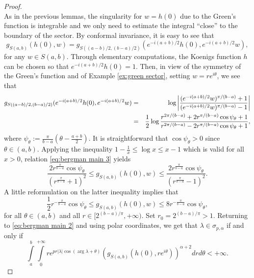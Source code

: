 \documentclass[11pt]{amsart}
\numberwithin{equation}{section}
\theoremstyle{definition}
\begin{document}
\begin{proof}
\begin{equation}
		\end{equation}
		As in the previous lemmas, the singularity for $w=h(0)$ due to the Green's function is integrable and we only need to estimate the integral ``close'' to the boundary of the sector. By conformal invariance, it is easy to see that 
		\begin{equation*}
			g_{S(a,b)}(h(0),w)=g_{S((a-b)/2,(b-a)/2)}(e^{-i(a+b)/2}h(0),e^{-i(a+b)/2}w), 
		\end{equation*}
		for any $w\in S(a,b)$. Through elementary computations, the Koenigs function $h$ can be chosen so that $e^{-i(a+b)/2}h(0)=1$. Then, in view of the symmetry of the Green's function and of Example \ref{ex:green sector}, setting $w=re^{i\theta}$, we see that
		\begin{eqnarray}\label{eq:bergman main 3}
			\notag	g_{S((a-b)/2,(b-a)/2)}(e^{-i(a+b)/2}h(0),e^{-i(a+b)/2}w)&=&\log\left|\dfrac{(e^{-i(a+b)/2}w)^{\pi/(b-a)}+1}{(e^{-i(a+b)/2}w)^{\pi/(b-a)}-1}\right| \\
			&=&\frac{1}{2}\log\dfrac{r^{2\pi/(b-a)}+2r^{\pi/(b-a)}\cos\psi_\theta+1}{r^{2\pi/(b-a)}-2r^{\pi/(b-a)}\cos\psi_\theta+1},
		\end{eqnarray}
		where $\psi_\theta:=\frac{\pi}{b-a}(\theta-\frac{a+b}{2})$. It is straightforward that $\cos\psi_\theta>0$ since $\theta\in(a,b)$. Applying the inequality $1-\frac{1}{x}\le \log x \le x-1$ which is valid for all $x>0$, relation \eqref{eq:bergman main 3} yields
		\begin{equation*}
			\dfrac{2r^{\frac{\pi}{b-a}}\cos\psi_\theta}{\left(r^{\frac{\pi}{b-a}}+1\right)^2} \le g_{S(a,b)}(h(0),w) \le \dfrac{2r^{\frac{\pi}{b-a}}\cos\psi_\theta}{\left(r^{\frac{\pi}{b-a}}-1\right)^2}.
		\end{equation*}
		A little reformulation on the latter inequality implies that
		\begin{equation}\label{eq:bergman main 4}
			\frac{1}{2}r^{-\frac{\pi}{b-a}}\cos\psi_\theta \le g_{S(a,b)}(h(0),w) \le 8 r^{-\frac{\pi}{b-a}}\cos\psi_\theta,
		\end{equation}
		for all $\theta\in(a,b)$ and all $r\in[2^{(b-a)/\pi},+\infty)$. Set $r_0=2^{(b-a)/\pi}>1$. Returning to \eqref{eq:bergman main 2} and using polar coordinates, we get that $\lambda\in\sigma_{p,\alpha}$ if and only if 
		\begin{equation}\label{eq:bergman main 5}
			\int\limits_{a}^{b}\int\limits_{0}^{+\infty}re^{pr|\lambda|\cos(\arg\lambda+\theta)}(g_{S(a,b)}(h(0),re^{i\theta}))^{\alpha+2}drd\theta<+\infty.
		\end{equation}

\end{proof}
\end{document}
